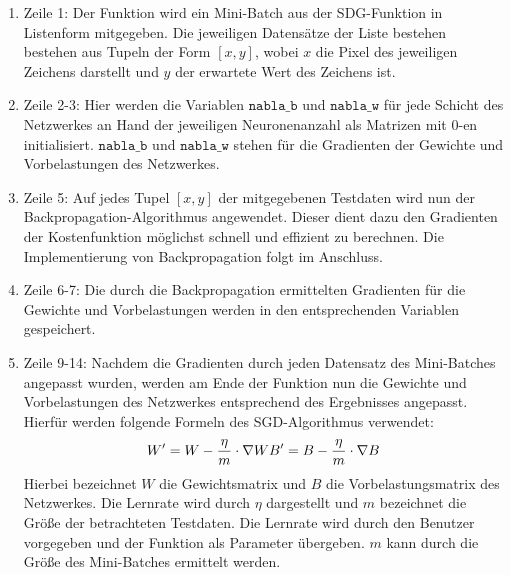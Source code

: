 \begin{enumerate}
\item Zeile 1: Der Funktion wird ein Mini-Batch aus der SDG-Funktion in Listenform mitgegeben. Die jeweiligen Datensätze der Liste bestehen bestehen aus Tupeln der Form $[x,y]$, wobei $x$ die Pixel des jeweiligen Zeichens darstellt und $y$ der erwartete Wert des Zeichens ist.
\item Zeile 2-3: Hier werden die Variablen $\mathtt{nabla\_b}$ und $\mathtt{nabla\_w}$ für jede Schicht des Netzwerkes an Hand der jeweiligen Neuronenanzahl als Matrizen mit 0-en initialisiert. $\mathtt{nabla\_b}$ und $\mathtt{nabla\_w}$ stehen für die Gradienten der Gewichte und Vorbelastungen des Netzwerkes.
\item Zeile 5: Auf jedes Tupel $[x,y]$ der mitgegebenen Testdaten wird nun der Backpropagation-Algorithmus angewendet. Dieser dient dazu den Gradienten der Kostenfunktion möglichst schnell und effizient zu berechnen. Die Implementierung von Backpropagation folgt im Anschluss.
\item Zeile 6-7: Die durch die Backpropagation ermittelten Gradienten für die Gewichte und Vorbelastungen werden in den entsprechenden Variablen gespeichert.
\item Zeile 9-14: Nachdem die Gradienten durch jeden Datensatz des Mini-Batches angepasst wurden, werden am Ende der Funktion nun die Gewichte und Vorbelastungen des Netzwerkes entsprechend des Ergebnisses angepasst. Hierfür werden folgende Formeln des SGD-Algorithmus verwendet:
\begin{equation}
	W' = W - \frac{\eta}{m}\cdot \nabla W \\
	B' = B - \frac{\eta}{m}\cdot \nabla B
\end{equation}
Hierbei bezeichnet $W$ die Gewichtsmatrix und $B$ die Vorbelastungsmatrix des Netzwerkes. Die Lernrate wird durch $\eta$ dargestellt und $m$ bezeichnet die Größe der betrachteten Testdaten. Die Lernrate wird durch den Benutzer vorgegeben und der Funktion als Parameter übergeben. $m$ kann durch die Größe des Mini-Batches ermittelt werden.
\end{enumerate}

